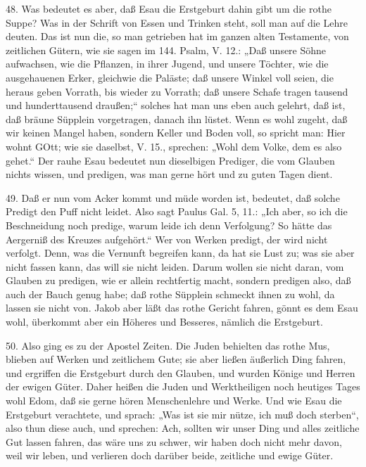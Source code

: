 48. Was bedeutet es aber, daß Esau die Erstgeburt dahin gibt um die rothe Suppe? Was in der Schrift von Essen und Trinken steht, soll man auf die Lehre deuten. Das ist nun die, so man getrieben hat im ganzen alten Testamente, von zeitlichen Gütern, wie sie sagen im 144. Psalm, V. 12.: „Daß unsere Söhne aufwachsen, wie die Pflanzen, in ihrer Jugend, und
unsere Töchter, wie die ausgehauenen Erker, gleichwie die Paläste; daß unsere Winkel voll seien, die heraus geben Vorrath, bis wieder zu Vorrath; daß unsere Schafe tragen tausend und hunderttausend draußen;“ solches hat man uns eben auch gelehrt, daß ist, daß bräune Süpplein vorgetragen, danach ihn lüstet. Wenn es wohl zugeht, daß wir keinen Mangel haben, sondern Keller und Boden voll, so spricht man: Hier wohnt GOtt; wie sie daselbst, V. 15., sprechen: „Wohl dem Volke, dem es also gehet.“ Der rauhe Esau bedeutet nun dieselbigen Prediger, die vom Glauben nichts wissen, und predigen, was man gerne hört und zu guten Tagen dient.

49. Daß er nun vom Acker kommt und müde worden ist, bedeutet, daß solche Predigt den Puff nicht leidet. Also sagt Paulus Gal. 5, 11.: „Ich aber, so ich die Beschneidung noch predige, warum leide ich denn Verfolgung? So hätte das Aergerniß des Kreuzes aufgehört.“ Wer von Werken predigt, der wird nicht verfolgt. Denn, was die Vernunft begreifen kann, da hat sie Lust zu; was sie aber nicht fassen kann, das will sie nicht leiden. Darum wollen sie nicht daran, vom Glauben zu predigen, wie er allein rechtfertig macht, sondern predigen also, daß auch der Bauch genug habe; daß rothe Süpplein schmeckt ihnen zu wohl, da lassen sie nicht von. Jakob aber läßt das rothe Gericht fahren, gönnt es dem Esau wohl, überkommt aber ein Höheres und Besseres, nämlich die Erstgeburt.

50. Also ging es zu der Apostel Zeiten. Die Juden behielten das rothe Mus, blieben auf Werken und zeitlichem Gute; sie aber ließen äußerlich Ding fahren, und ergriffen die Erstgeburt durch den Glauben, und wurden Könige und Herren der ewigen Güter. Daher heißen die Juden und Werktheiligen noch heutiges Tages wohl Edom, daß sie gerne hören Menschenlehre und Werke. Und wie Esau die Erstgeburt verachtete, und sprach: „Was ist sie mir nütze, ich muß doch sterben“, also thun diese auch, und sprechen: Ach, sollten wir unser Ding und alles zeitliche Gut lassen fahren, das wäre uns zu schwer, wir haben doch nicht mehr davon, weil wir leben, und verlieren doch darüber beide, zeitliche und ewige Güter.

